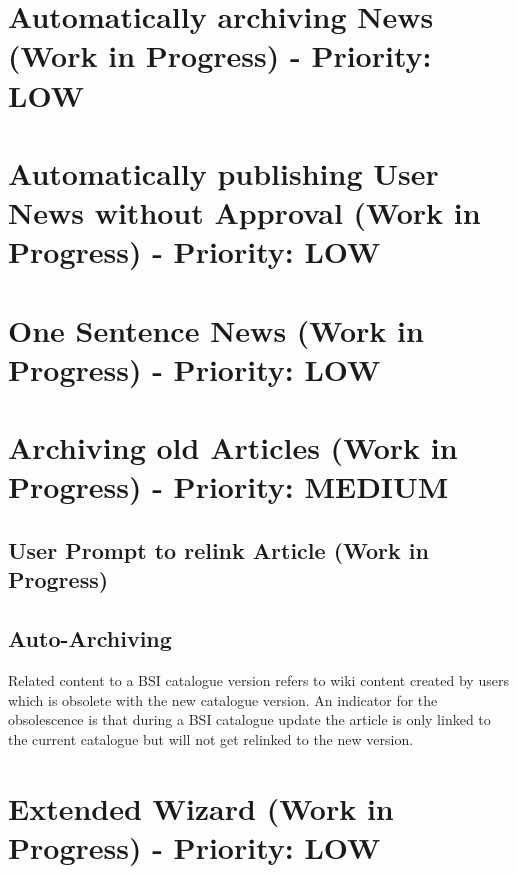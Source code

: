 \section{Automatically archiving News (Work in Progress) - Priority: LOW}



\section{Automatically publishing User News without Approval (Work in Progress) - Priority: LOW}



\section{One Sentence News (Work in Progress) - Priority: LOW}



\section{Archiving old Articles (Work in Progress) - Priority: MEDIUM}
\subsection{User Prompt to relink Article (Work in Progress)}

\subsection{Auto-Archiving}
\label{archive_relcon}
Related content to a BSI catalogue version refers to wiki content created by users which is obsolete with the new catalogue version. 
An indicator for the obsolescence is that during a BSI catalogue update the article is only linked to the current catalogue but will not get relinked to the new version.


\section{Extended Wizard (Work in Progress) - Priority: LOW}

